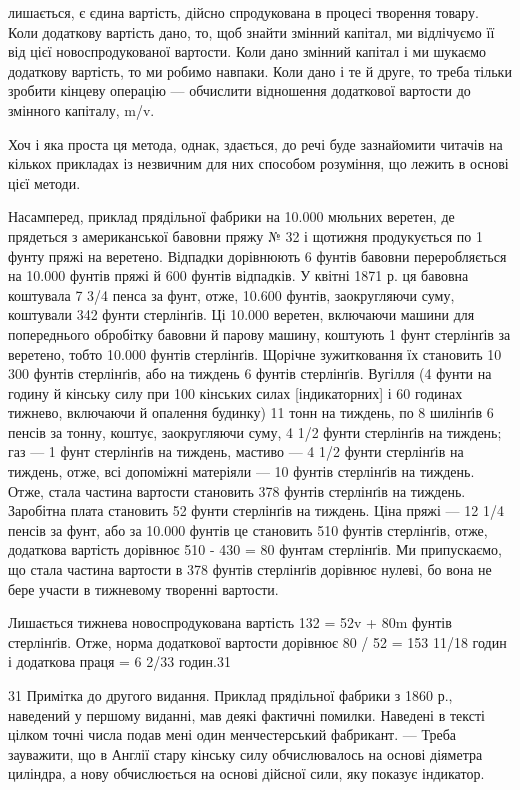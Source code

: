 лишається, є єдина вартість, дійсно спродукована в процесі творення товару. Коли додаткову вартість
дано, то, щоб знайти змінний капітал, ми відлічуємо її від цієї новоспродукованої вартости.
Коли дано змінний капітал і ми шукаємо додаткову вартість, то ми робимо навпаки. Коли дано і те й
друге, то треба тільки зробити кінцеву операцію — обчислити відношення додаткової вартости до
змінного капіталу, m/v.

Хоч і яка проста ця метода, однак, здається, до речі буде зазнайомити читачів на кількох прикладах
із незвичним для них
способом розуміння, що лежить в основі цієї методи.

Насамперед, приклад прядільної фабрики на 10.000 мюльних веретен, де прядеться з американської
бавовни пряжу № 32 і
щотижня продукується по 1 фунту пряжі на веретено. Відпадки дорівнюють 6%
фунтів бавовни переробляється на 10.000 фунтів пряжі й 600 фунтів відпадків. У квітні 1871 р. ця
бавовна коштувала 7 3/4 пенса за фунт, отже, 10.600 фунтів, заокругляючи суму, коштували 342 фунти
стерлінґів. Ці 10.000
веретен, включаючи машини для попереднього обробітку бавовни й парову машину, коштують 1 фунт
стерлінґів за веретено, тобто 10.000 фунтів стерлінґів. Щорічне зужитковання їх становить
10%
300 фунтів стерлінґів, або на тиждень 6 фунтів стерлінґів. Вугілля (4 фунти на годину
й кінську силу при 100 кінських силах [індикаторних] і 60 годинах тижнево, включаючи й опалення
будинку) 11 тонн
на тиждень, по 8 шилінґів 6 пенсів за тонну, коштує, заокругляючи суму, 4 1/2 фунти стерлінґів на
тиждень; газ — 1 фунт стерлінґів на тиждень, мастиво — 4 1/2 фунти стерлінґів на тиждень, отже, всі
допоміжні матеріяли — 10 фунтів стерлінґів на тиждень. Отже, стала частина вартости становить 378
фунтів стерлінґів
на тиждень. Заробітна плата становить 52 фунти стерлінґів на тиждень. Ціна пряжі — 12 1/4 пенсів за
фунт, або за 10.000 фунтів
це становить 510 фунтів стерлінґів, отже, додаткова вартість дорівнює 510 - 430 = 80 фунтам
стерлінґів. Ми припускаємо, що стала частина вартости в 378 фунтів стерлінґів дорівнює нулеві, бо
вона не бере участи в тижневому творенні вартости.

Лишається тижнева новоспродукована вартість 132 = 52v + 80m фунтів стерлінґів. Отже, норма
додаткової вартости дорівнює
80 / 52 = 153 11/18%
годин і додаткова праця = 6 2/33 годин.31

31 Примітка до другого видання. Приклад прядільної фабрики з 1860 р., наведений у першому виданні,
мав деякі фактичні помилки. Наведені в тексті цілком точні числа подав мені один менчестерський
фабрикант. — Треба зауважити, що в Англії стару кінську силу обчислювалось
на основі діяметра циліндра, а нову обчислюється на основі дійсної сили, яку показує індикатор.
